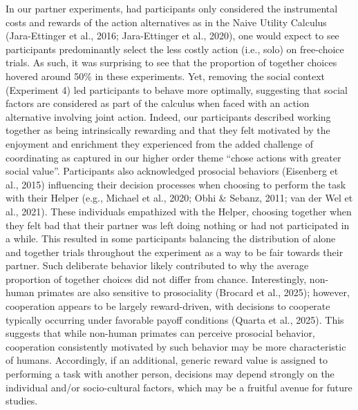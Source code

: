 \documentclass[
  11pt,
  letterpaper,
]{article}
\begin{document}
In our partner experiments, had participants only considered the
instrumental costs and rewards of the action alternatives as in the
Naive Utility Calculus (Jara-Ettinger et al., 2016; Jara-Ettinger et
al., 2020), one would expect to see participants predominantly select
the less costly action (i.e., solo) on free-choice trials. As such, it
was surprising to see that the proportion of together choices hovered
around 50\% in these experiments. Yet, removing the social context
(Experiment 4) led participants to behave more optimally, suggesting
that social factors are considered as part of the calculus when faced
with an action alternative involving joint action. Indeed, our
participants described working together as being intrinsically rewarding
and that they felt motivated by the enjoyment and enrichment they
experienced from the added challenge of coordinating as captured in our
higher order theme ``chose actions with greater social value''.
Participants also acknowledged prosocial behaviors (Eisenberg et al.,
2015) influencing their decision processes when choosing to perform the
task with their Helper (e.g., Michael et al., 2020; Obhi \& Sebanz,
2011; {van der Wel et al.}, 2021). These individuals empathized with the
Helper, choosing together when they felt bad that their partner was left
doing nothing or had not participated in a while. This resulted in some
participants balancing the distribution of alone and together trials
throughout the experiment as a way to be fair towards their partner.
Such deliberate behavior likely contributed to why the average
proportion of together choices did not differ from chance.
Interestingly, non-human primates are also sensitive to prosociality
(Brocard et al., 2025); however, cooperation appears to be largely
reward-driven, with decisions to cooperate typically occurring under
favorable payoff conditions (Quarta et al., 2025). This suggests that
while non-human primates can perceive prosocial behavior, cooperation
consistently motivated by such behavior may be more characteristic of
humans. Accordingly, if an additional, generic reward value is assigned
to performing a task with another person, decisions may depend strongly
on the individual and/or socio-cultural factors, which may be a fruitful
avenue for future studies.
\end{document}
